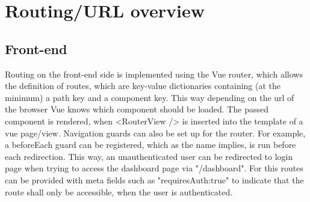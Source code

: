 \section{Routing/URL overview}

\subsection{Front-end}

Routing on the front-end side is implemented using the Vue router, which allows the definition of routes, which are key-value dictionaries containing (at the minimum) a path key and a component key. This way depending on the url of the browser Vue knows which component should be loaded. The passed component is rendered, when <RouterView /> is inserted into the template of a vue page/view.
Navigation guards can also be set up for the router. For example, a beforeEach guard can be registered, which as the name implies, is run before each redirection. This way, an unauthenticated user can be redirected to login page when trying to access the dashboard page via "/dashboard".  For this routes can be provided with meta fields such as "requiresAuth:true" to indicate that the route shall only be accessible, when the user is authenticated. 

\label{ssec:routing-front-end}
